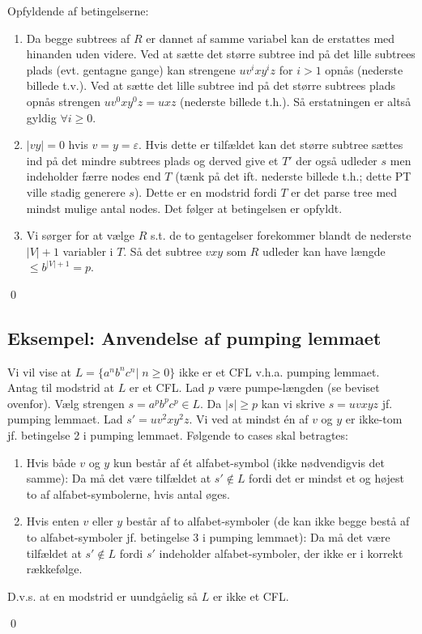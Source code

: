 Opfyldende af betingelserne:
\begin{enumerate}
	\item Da begge subtrees af $R$ er dannet af samme variabel kan de erstattes med hinanden uden videre. Ved at sætte det større subtree ind på det lille subtrees plads (evt. gentagne gange) kan strengene $uv^ixy^iz$ for $i>1$ opnås (nederste billede t.v.). Ved at sætte det lille subtree ind på det større subtrees plads opnås strengen $uv^0xy^0z=uxz$ (nederste billede t.h.). Så erstatningen er altså gyldig $\forall i \ge 0$.
	\item $|vy|=0$ hvis $v=y=\varepsilon$. Hvis dette er tilfældet kan det større subtree sættes ind på det mindre subtrees plads og derved give et $T'$ der også udleder $s$ men indeholder færre nodes end $T$ (tænk på det ift. nederste billede t.h.; dette PT ville stadig generere $s$). Dette er en modstrid fordi $T$ er det parse tree med mindst mulige antal nodes. Det følger at betingelsen er opfyldt.
	\item Vi sørger for at vælge $R$ s.t. de to gentagelser forekommer blandt de nederste $|V|+1$ variabler i $T$. Så det subtree $vxy$ som $R$ udleder kan have længde $ \le b^{|V|+1}=p$.     
\end{enumerate}
\begin{flushright}
	\qed
\end{flushright}
\subsection*{Eksempel: Anvendelse af pumping lemmaet}

Vi vil vise at $L=\{a^n b^n c^n| \; n \ge 0\}$ ikke er et CFL v.h.a. pumping lemmaet. \\

Antag til modstrid at $L$ er et CFL. Lad $p$ være pumpe-længden (se beviset ovenfor). Vælg strengen $s=a^p b^p c^p \in L$. Da $|s| \ge p$ kan vi skrive $s=uvxyz$ jf. pumping lemmaet. Lad $s'=uv^2xy^2z$. Vi ved at mindst én af $v$ og $y$ er ikke-tom jf. betingelse 2 i pumping lemmaet. Følgende to cases skal betragtes:
\begin{enumerate}
	\item Hvis både $v$ og $y$ kun består af ét alfabet-symbol (ikke nødvendigvis det samme): Da må det være tilfældet at $s' \notin L$ fordi det er mindst et og højest  to af alfabet-symbolerne, hvis antal øges.
	\item Hvis enten $v$ eller $y$ består af to alfabet-symboler (de kan ikke begge bestå af to alfabet-symboler jf. betingelse 3 i pumping lemmaet): Da må det være tilfældet at $s' \notin L$ fordi $s'$ indeholder alfabet-symboler, der ikke er i korrekt rækkefølge.   
\end{enumerate} 
D.v.s. at en modstrid er uundgåelig så $L$ er ikke et CFL.
\begin{flushright}
	\qed
\end{flushright}
